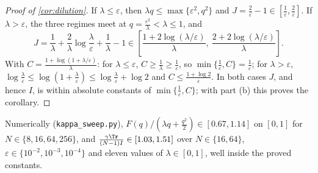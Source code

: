 \begin{proof}[Proof of \cref{cor:dilution}]
If $\lambda\le\varepsilon$, then $\lambda q\le\max\{\varepsilon^2,q^2\}$ and $J=\tfrac{2}{\varepsilon}-1\in[\tfrac{1}{\varepsilon},\tfrac{2}{\varepsilon}]$.
If $\lambda>\varepsilon$, the three regimes meet at $q=\tfrac{\varepsilon^2}{\lambda}<\lambda\le1$, and
\[
 J=\frac{1}{\lambda}+\frac{2}{\lambda}\log\frac{\lambda}{\varepsilon}+\frac{1}{\lambda}-1
 \in\left[\frac{1+2\log(\lambda/\varepsilon)}{\lambda},\ \frac{2+2\log(\lambda/\varepsilon)}{\lambda}\right].
\]
With $C=\tfrac{1+\log(1+\lambda/\varepsilon)}{\lambda}$: for $\lambda\le\varepsilon$, $C\ge\tfrac{1}{\lambda}\ge\tfrac{1}{\varepsilon}$, so $\min\{\tfrac{1}{\varepsilon},C\}=\tfrac{1}{\varepsilon}$;
for $\lambda>\varepsilon$, $\log\tfrac{\lambda}{\varepsilon}\le\log(1+\tfrac{\lambda}{\varepsilon})\le\log\tfrac{\lambda}{\varepsilon}+\log2$ and $C\le\tfrac{1+\log2}{\varepsilon}$.
In both cases $J$, and hence $I$, is within absolute constants of $\min\{\tfrac{1}{\varepsilon},C\}$; with part (b) this proves the corollary.
\end{proof}
Numerically (\texttt{kappa\_sweep.py}), $F(q)/(\lambda q+\tfrac{q^2}{2})\in[0.67,1.14]$ on $[0,1]$ for $N\in\{8,16,64,256\}$, and
$\tfrac{\gamma\Tr}{(N-1)I}\in[1.03,1.51]$ over $N\in\{16,64\}$, $\varepsilon\in\{10^{-2},10^{-3},10^{-4}\}$ and eleven values of $\lambda\in[0,1]$, well inside the proved constants.

